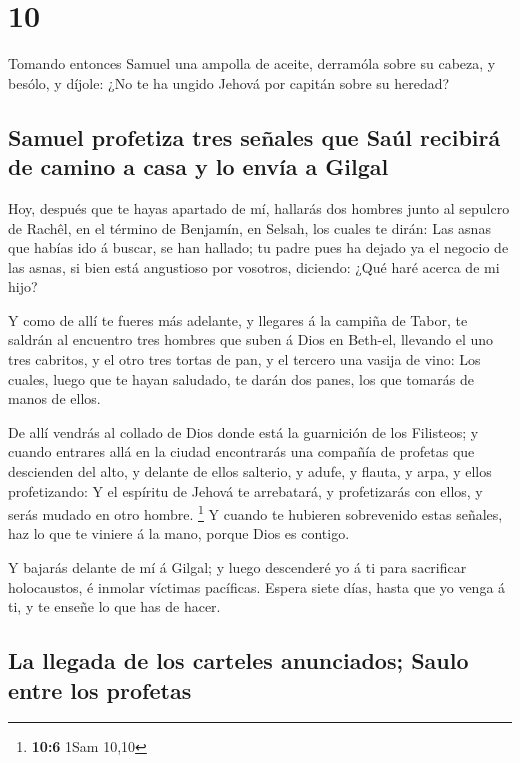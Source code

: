 \hypertarget{section-9}{%
\section{10}\label{section-9}}

 Tomando entonces Samuel una ampolla de aceite, derramóla
sobre su cabeza, y besólo, y díjole: ¿No te ha ungido Jehová por capitán
sobre su heredad?

\hypertarget{samuel-profetiza-tres-seuxf1ales-que-sauxfal-recibiruxe1-de-camino-a-casa-y-lo-envuxeda-a-gilgal}{%
\subsection{Samuel profetiza tres señales que Saúl recibirá de camino a
casa y lo envía a
Gilgal}\label{samuel-profetiza-tres-seuxf1ales-que-sauxfal-recibiruxe1-de-camino-a-casa-y-lo-envuxeda-a-gilgal}}

 Hoy, después que te hayas apartado de mí, hallarás dos
hombres junto al sepulcro de Rachêl, en el término de Benjamín, en
Selsah, los cuales te dirán: Las asnas que habías ido á buscar, se han
hallado; tu padre pues ha dejado ya el negocio de las asnas, si bien
está angustioso por vosotros, diciendo: ¿Qué haré acerca de mi hijo?

 Y como de allí te fueres más adelante, y llegares á la
campiña de Tabor, te saldrán al encuentro tres hombres que suben á Dios
en Beth-el, llevando el uno tres cabritos, y el otro tres tortas de pan,
y el tercero una vasija de vino:  Los cuales, luego que te
hayan saludado, te darán dos panes, los que tomarás de manos de ellos.

 De allí vendrás al collado de Dios donde está la guarnición
de los Filisteos; y cuando entrares allá en la ciudad encontrarás una
compañía de profetas que descienden del alto, y delante de ellos
salterio, y adufe, y flauta, y arpa, y ellos profetizando: 
Y el espíritu de Jehová te arrebatará, y profetizarás con ellos, y serás
mudado en otro hombre. \footnote{\textbf{10:6} 1Sam 10,10} 
Y cuando te hubieren sobrevenido estas señales, haz lo que te viniere á
la mano, porque Dios es contigo.

 Y bajarás delante de mí á Gilgal; y luego descenderé yo á
ti para sacrificar holocaustos, é inmolar víctimas pacíficas. Espera
siete días, hasta que yo venga á ti, y te enseñe lo que has de hacer.

\hypertarget{la-llegada-de-los-carteles-anunciados-saulo-entre-los-profetas}{%
\subsection{La llegada de los carteles anunciados; Saulo entre los
profetas}\label{la-llegada-de-los-carteles-anunciados-saulo-entre-los-profetas}}

